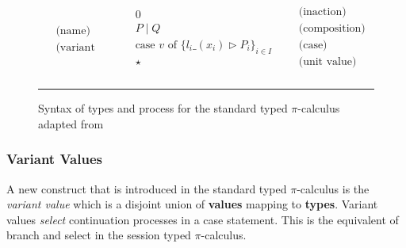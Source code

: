 \begin{figure}[h]
\begin{align*}
\begin{split}
            &\text{(name)} \\
            &\text{(variant value)} 
        \end{split}
        & 
        \begin{split}
            & 0 \\
            & P \; | \; Q \\
            & \text{case } v \text{ of } \{l_i\_(x_i) \vartriangleright P_i\}_{i \in I}\\[10pt]
            & \star \\
            & 
        \end{split}
        &
        \begin{split}
            &\text{(inaction)} \\
            &\text{(composition)} \\
            &\text{(case)} \\[10pt]
            &\text{(unit value)} \\
            &
        \end{split}
    \end{align*}
    \noindent\rule{12cm}{0.8pt}
    \caption{Syntax of types and process for the standard typed $\pi$-calculus adapted from \citep{dardha2017session}}
    \label{fig:lintypesSyntax}
\end{figure}

\subsubsection{Variant Values} A new construct that is introduced in the standard typed $\pi$-calculus is the \textit{variant value} which is a disjoint union of \textbf{values} mapping to \textbf{types}. Variant values \textit{select} continuation processes in a case statement. This is the equivalent of branch and select in the session typed $\pi$-calculus.


